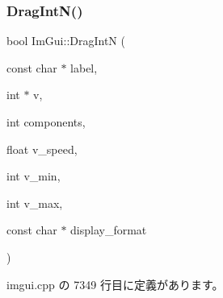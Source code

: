 \subsubsection{\texorpdfstring{Drag\+Int\+N()}{DragIntN()}}
{\footnotesize\ttfamily bool Im\+Gui\+::\+Drag\+IntN (\begin{DoxyParamCaption}\item[{const char $\ast$}]{label,  }\item[{int $\ast$}]{v,  }\item[{int}]{components,  }\item[{float}]{v\+\_\+speed,  }\item[{int}]{v\+\_\+min,  }\item[{int}]{v\+\_\+max,  }\item[{const char $\ast$}]{display\+\_\+format }\end{DoxyParamCaption})}



 imgui.\+cpp の 7349 行目に定義があります。

